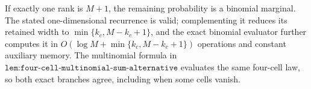 If exactly one rank is \(M+1\), the remaining probability is a binomial marginal. The stated one-dimensional recurrence is valid; complementing it reduces its retained width to \(\min\{k_c,M-k_c+1\}\), and the exact binomial evaluator further computes it in \(O(\log M+\min\{k_c,M-k_c+1\})\) operations and constant auxiliary memory. The multinomial formula in \(\texttt{lem:four-cell-multinomial-sum-alternative}\) evaluates the same four-cell law, so both exact branches agree, including when some cells vanish.
